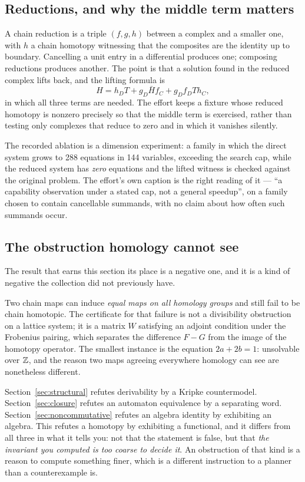 \subsection{Reductions, and why the middle term matters}

A chain reduction is a triple $(f,g,h)$ between a complex and a smaller one,
with $h$ a chain homotopy witnessing that the composites are the identity up to
boundary. Cancelling a unit entry in a differential produces one; composing
reductions produces another. The point is that a solution found in the reduced
complex lifts back, and the lifting formula is
\[
 H=h_D T+g_D\bar H f_C+g_D f_D T h_C,
\]
in which all three terms are needed. The effort keeps a fixture whose reduced
homotopy is nonzero precisely so that the middle term is exercised, rather than
testing only complexes that reduce to zero and in which it vanishes silently.

The recorded ablation is a dimension experiment: a family in which the direct
system grows to 288 equations in 144 variables, exceeding the search cap, while
the reduced system has \emph{zero} equations and the lifted witness is checked
against the original problem. The effort's own caption is the right reading of
it --- ``a capability observation under a stated cap, not a general speedup'',
on a family chosen to contain cancellable summands, with no claim about how
often such summands occur.

\subsection{The obstruction homology cannot see}

The result that earns this section its place is a negative one, and it is a
kind of negative the collection did not previously have.

Two chain maps can induce \emph{equal maps on all homology groups} and still
fail to be chain homotopic. The certificate for that failure is not a
divisibility obstruction on a lattice system; it is a matrix $W$ satisfying an
adjoint condition under the Frobenius pairing, which separates the difference
$F-G$ from the image of the homotopy operator. The smallest instance is the
equation $2a+2b=1$: unsolvable over $\mathbb{Z}$, and the reason two maps agreeing
everywhere homology can see are nonetheless different.

\begin{remark}
Section~\ref{sec:structural} refutes derivability by a Kripke countermodel.
Section~\ref{sec:closure} refutes an automaton equivalence by a separating
word. Section~\ref{sec:noncommutative} refutes an algebra identity by
exhibiting an algebra. This refutes a homotopy by exhibiting a functional, and
it differs from all three in what it tells you: not that the statement is
false, but that \emph{the invariant you computed is too coarse to decide it}.
An obstruction of that kind is a reason to compute something finer, which is a
different instruction to a planner than a counterexample is.
\end{remark}

